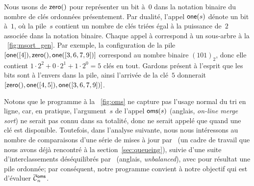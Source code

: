 Nous usons de \(\textsf{zero}()\) pour
représenter un bit à~\(0\) dans la notation binaire du nombre de clés
ordonnées présentement. Par dualité, l'appel
\(\textsf{one}(s)\) dénote un bit à~\(1\), où la
pile~\(s\) contient un nombre de clés triées égal à la puissance
de~\(2\) associée dans la notation binaire. Chaque appel à 
correspond à un sous-arbre à la
\fig~\vref{fig:msort_gen}. Par exemple, la configuration de la pile
\([\textsf{one}([4]), \textsf{zero}(), \textsf{one}([3,6,7,9])]\) correspond au
nombre binaire \((101)_2\), donc elle contient \(1 \cdot 2^2 + 0 \cdot
2^1 + 1 \cdot 2^0 = 5\) clés en tout. Gardons présent à l'esprit que
les bits sont à l'envers dans la pile, ainsi l'arrivée de la clé~\(5\)
donnerait \([\textsf{zero}(),\textsf{one}([4,5]),\textsf{one}([3,6,7,9])]\).

Notons que le programme à la \fig~\vref{fig:oms} ne capture pas
l'usage normal du tri en ligne, car, en pratique, l'argument~\(s\) de
l'appel \(\textsf{oms}(s)\) (anglais,
\emph{on-line merge sort}) ne serait pas connu dans sa totalité, donc
 ne serait appelé que quand une clé
est disponible. Toutefois, dans l'analyse suivante, nous nous
intéressons au nombre de comparaisons d'une série de mises à jour
par~ (un cadre de travail que nous
avons déjà rencontré à la section~\ref{sec:queueing}), suivie d'une
suite d'interclassements déséquilibrés
par~ (anglais, \emph{unbalanced}),
avec pour résultat une pile ordonnée; par conséquent, notre programme
convient à notre objectif qui est d'évaluer
\(\OC{\fun{oms}}{n}\).

